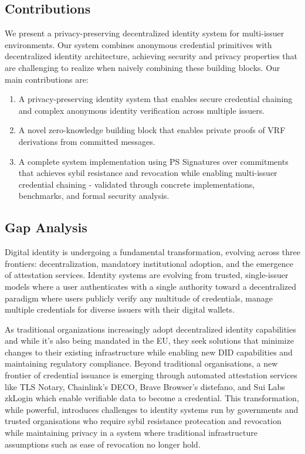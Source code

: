 \subsection{Contributions}

We present a privacy-preserving decentralized identity system for multi-issuer environments. Our system combines anonymous credential primitives with decentralized identity architecture, achieving security and privacy properties that are challenging to realize when naively combining these building blocks. Our main contributions are:

\begin{enumerate}
    
    \item  A privacy-preserving identity system that enables secure credential chaining and complex anonymous identity verification across multiple issuers.

    \item A novel zero-knowledge building block that enables private proofs of VRF derivations from committed messages.
    
    \item  A complete system implementation using PS Signatures over commitments that achieves sybil resistance and revocation while enabling multi-issuer credential chaining - validated through concrete implementations, benchmarks, and formal security analysis.

\end{enumerate}

\subsection{Gap Analysis}

Digital identity is undergoing a fundamental transformation, evolving across three frontiers: decentralization, mandatory institutional adoption, and the emergence of attestation services.    
Identity systems are evolving from trusted, single-issuer models where a user authenticates with a single authority toward a decentralized paradigm where users publicly verify any multitude of credentials, manage multiple credentials for diverse issuers with their digital wallets.

\noindent As traditional organizations increasingly adopt decentralized identity capabilities and while it's also being mandated in the EU, they seek solutions that minimize changes to their existing infrastructure while enabling new DID capabilities and maintaining regulatory compliance. Beyond traditional organisations, a new frontier of credential issuance is emerging through automated attestation services like TLS Notary, Chainlink's DECO, Brave Browser's distefano, and Sui Labs zkLogin which enable verifiable data to become a credential. This transformation, while powerful, introduces challenges to identity systems run by governments and trusted organisations  who require sybil resistance protecation and revocation while maintaining privacy in a system where traditional infrastructure assumptions such as ease of revocation no longer hold.

